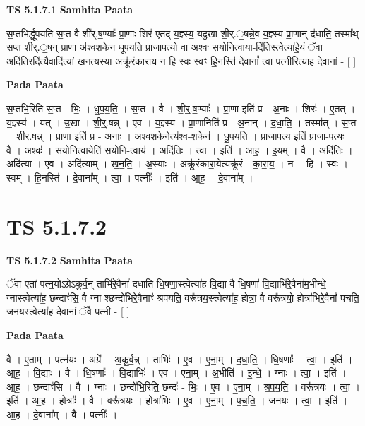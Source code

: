 \documentclass[17pt]{extarticle}
\begin{document}
\textbf{TS 5.1.7.1 } \newline
\textbf{Samhita Paata} \newline

स॒प्तभि॑र्द्धूपयति स॒प्त वै शी॑र्.ष॒ण्याः᳚ प्रा॒णाः शिर॑ ए॒तद्-य॒ज्ञ्स्य॒ यदु॒खा शी॒र्.॒षन्ने॒व य॒ज्ञ्स्य॑ प्रा॒णान् द॑धाति॒ तस्मा᳚थ् स॒प्त शी॒र्.॒षन् प्रा॒णा अ॑श्वश॒केन॑ धूपयति प्राजाप॒त्यो वा अश्वः॑ सयोनि॒त्वाया-दि॑ति॒स्त्वेत्या॑हे॒यं ॅवा अदि॑ति॒रदि॑त्यै॒वादि॑त्यां खनत्य॒स्या अक्रू॑रंकाराय॒ न हि स्वः स्वꣳ हि॒नस्ति॑ दे॒वानां᳚ त्वा॒ पत्नी॒रित्या॑ह दे॒वानां॒ - [  ] \newline

\textbf{Pada Paata} \newline

स॒प्तभि॒रिति॑ स॒प्त - भिः॒ । धू॒प॒य॒ति॒ । स॒प्त । वै । शी॒र्॒.ष॒ण्याः᳚ । प्रा॒णा इति॑ प्र - अ॒नाः । शिरः॑ । ए॒तत् । य॒ज्ञ्स्य॑ । यत् । उ॒खा । शी॒र्॒.षन्न् । ए॒व । य॒ज्ञ्स्य॑ । प्रा॒णानिति॑ प्र - अ॒नान् । द॒धा॒ति॒ । तस्मा᳚त् । स॒प्त । शी॒र॒.षन्न् । प्रा॒णा इति॑ प्र - अ॒नाः । अ॒श्व॒श॒केनेत्य॑श्व-श॒केन॑ । धू॒प॒य॒ति॒ । प्रा॒जा॒प॒त्य इति॑ प्राजा-प॒त्यः । वै । अश्वः॑ । स॒यो॒नि॒त्वायेति॑ सयोनि-त्वाय॑ । अदि॑तिः । त्वा॒ । इति॑ । आ॒ह॒ । इ॒यम् । वै । अदि॑तिः । अदि॑त्या । ए॒व । अदि॑त्याम् । ख॒न॒ति॒ । अ॒स्याः । अक्रू॑रंकारा॒येत्यक्रू॑रं - का॒रा॒य॒ । न । हि । स्वः । स्वम् । हि॒नस्ति॑ । दे॒वाना᳚म् । त्वा॒ । पत्नीः᳚ । इति॑ । आ॒ह॒ । दे॒वाना᳚म् ।  \newline




\section*{ TS 5.1.7.2 }

\textbf{TS 5.1.7.2 } \newline
\textbf{Samhita Paata} \newline

ॅवा ए॒तां पत्न॒योऽग्रे॑ऽकुर्व॒न् ताभि॑रे॒वैनां᳚ दधाति धि॒षणा॒स्त्वेत्या॑ह वि॒द्या वै धि॒षणा॑ वि॒द्याभि॑रे॒वैना॑म॒भीन्धे॒ ग्नास्त्वेत्या॑ह॒ छन्दाꣳ॑सि॒ वै ग्ना श्छन्दो॑भिरे॒वैनाꣳ॑ श्रपयति॒ वरू᳚त्रय॒स्त्त्वेत्या॑ह॒ होत्रा॒ वै वरू᳚त्रयो॒ होत्रा॑भिरे॒वैनां᳚ पचति॒ जन॑य॒स्त्वेत्या॑ह दे॒वानां॒ ॅवै पत्नी॒ - [  ] \newline

\textbf{Pada Paata} \newline

वै । ए॒ताम् । पत्न॑यः । अग्रे᳚ । अ॒कु॒र्व॒न्न् । ताभिः॑ । ए॒व । ए॒ना॒म् । द॒धा॒ति॒ । धि॒षणाः᳚ । त्वा॒ । इति॑ । आ॒ह॒ । वि॒द्याः । वै । धि॒षणाः᳚ । वि॒द्याभिः॑ । ए॒व । ए॒ना॒म् । अ॒भीति॑ । इ॒न्धे॒ । ग्नाः । त्वा॒ । इति॑ । आ॒ह॒ । छन्दाꣳ॑सि । वै । ग्नाः । छन्दो॑भि॒रिति॒ छन्दः॑ - भिः॒ । ए॒व । ए॒ना॒म् । श्र॒प॒य॒ति॒ । वरू᳚त्रयः । त्वा॒ । इति॑ । आ॒ह॒ । होत्राः᳚ । वै । वरू᳚त्रयः । होत्रा॑भिः । ए॒व । ए॒ना॒म् । प॒च॒ति॒ । जन॑यः । त्वा॒ । इति॑ । आ॒ह॒ । दे॒वाना᳚म् । वै । पत्नीः᳚ ।  \newline
\end{document}
